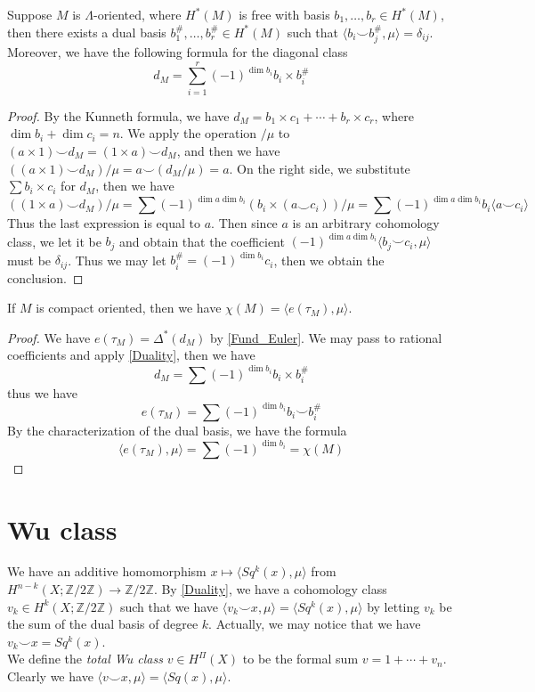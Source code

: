 	\begin{thm}\label{Duality}
		Suppose $M$ is $\Lambda$-oriented, where $H^*(M)$ is free with basis $b_1,\dots,b_r\in H^*(M)$, then there exists a dual basis $b_1^\#,\dots,b_r^\#\in H^*(M)$ such that $\langle b_i\smile b_j^\#,\mu\rangle=\delta_{ij}$. \\
		Moreover, we have the following formula for the diagonal class
		\[ d_M=\sum_{i=1}^r(-1)^{\dim b_i}b_i\times b_i^\# \]
	\end{thm}
	\begin{proof}
		By the Kunneth formula, we have $d_M=b_1\times c_1+\cdots+b_r\times c_r$, where $\dim b_i+\dim c_i=n$. We apply the operation $/\mu$ to $(a\times 1)\smile d_M=(1\times a)\smile d_M$, and then we have 
		$((a\times 1)\smile d_M)/\mu=a\smile(d_M/\mu)=a$. On the right side, we substitute $\sum b_i\times c_i$ for $d_M$, then we have 
		\[ ((1\times a)\smile d_M)/\mu=\sum(-1)^{\dim a\dim b_i}(b_i\times(a\smile c_i))/\mu=\sum(-1)^{\dim a\dim b_i}b_i\langle a\smile c_i\rangle \]
		Thus the last expression is equal to $a$. Then since $a$ is an arbitrary cohomology class, we let it be $b_j$ and obtain that the coefficient $(-1)^{\dim a\dim b_i}\langle b_j\smile c_i,\mu\rangle$ must be $\delta_{ij}$. Thus we may let $b_i^\#=(-1)^{\dim b_i}c_i$, then we obtain the conclusion.  
	\end{proof}

	\begin{coro}\label{Euler_class_char}
		If $M$ is compact oriented, then we have $\chi(M)=\langle e(\tau_M),\mu\rangle$. 
	\end{coro}
	\begin{proof}
		We have $e(\tau_M)=\Delta^*(d_M)$ by \cref{Fund_Euler}. We may pass to rational coefficients and apply \cref{Duality}, then we have
		\[ d_M=\sum(-1)^{\dim b_i}b_i\times b_i^\# \]
		thus we have
		\[ e(\tau_M)=\sum(-1)^{\dim b_i}b_i\smile b_i^\# \] 
		By the characterization of the dual basis, we have the formula 
		\[ \langle e(\tau_M),\mu\rangle=\sum(-1)^{\dim b_i}=\chi(M) \]
	\end{proof}

\section{Wu class}

	\begin{defn}\label{Wu_class}
		We have an additive homomorphism $x\mapsto\langle Sq^k(x),\mu\rangle$ from \\
		$H^{n-k}(X;\mathbb{Z}/2\mathbb{Z})\to\mathbb{Z}/2\mathbb{Z}$. By \cref{Duality}, we have a cohomology class $v_k\in H^k(X;\mathbb{Z}/2\mathbb{Z})$ such that we have $\langle v_k\smile x,\mu\rangle=\langle Sq^k(x),\mu\rangle$ by letting $v_k$ be the sum of the dual basis of degree $k$. Actually, we may notice that we have $v_k\smile x=Sq^k(x)$. \\
		We define the \emph{total Wu class} $v\in H^\Pi(X)$ to be the formal sum $v=1+\cdots+v_n$. Clearly we have $\langle v\smile x,\mu\rangle=\langle Sq(x),\mu\rangle$. 
	\end{defn}

